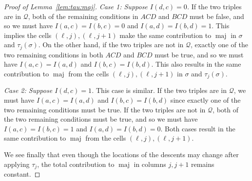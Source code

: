 \documentclass[ALCO,Unicode]{cedram}
\DeclareMathOperator{\maj}{maj}
\newcommand{\cQ}{\mathcal{Q}}
\begin{document}
\begin{proof}[Proof of Lemma~\ref{lem:tau:maj}]
\emph{Case 1: Suppose $I(d,c)=0$.} If the two triples are in $\cQ$, both of the remaining conditions in $ACD$ and $BCD$ must be false, and so we must have $I(a,c)=I(b,c)=0$ and $I(a,d)=I(b,d)=1$. This implies the cells $(\ell,j),(\ell,j+1)$ make the same contribution to $\maj$ in $\sigma$ and $\tau_j(\sigma)$. On the other hand, if the two triples are not in $\cQ$, exactly one of the two remaining conditions in both $ACD$ and $BCD$ must be true, and so we must have $I(a,c)=I(a,d)$ and $I(b,c)=I(b,d)$. This also results in the same contribution to $\maj$ from the cells $(\ell,j),(\ell,j+1)$ in $\sigma$ and $\tau_j(\sigma)$.

\emph{Case 2: Suppose $I(d,c)=1$.} This case is similar. If the two triples are in $\cQ$, we must have $I(a,c)=I(a,d)$ and $I(b,c)=I(b,d)$ since exactly one of the two remaining conditions must be true. If the two triples are not in $\cQ$, both of the two remaining conditions must be true, and so we must have $I(a,c)=I(b,c)=1$ and $I(a,d)=I(b,d)=0$. Both cases result in the same contribution to $\maj$ from the cells $(\ell,j),(\ell,j+1)$.

We see finally that even though the locations of the descents may change after applying $\tau_j$, the total contribution to $\maj$ in columns $j,j+1$ remains constant.
\end{proof}
\end{document}
